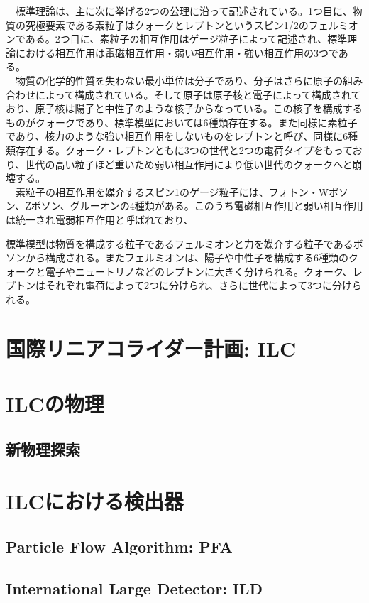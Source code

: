 　標準理論は、主に次に挙げる2つの公理に沿って記述されている。1つ目に、物質の究極要素である素粒子はクォークとレプトンというスピン1/2のフェルミオンである。2つ目に、素粒子の相互作用はゲージ粒子によって記述され、標準理論における相互作用は電磁相互作用・弱い相互作用・強い相互作用の3つである。\\
　物質の化学的性質を失わない最小単位は分子であり、分子はさらに原子の組み合わせによって構成されている。そして原子は原子核と電子によって構成されており、原子核は陽子と中性子のような核子からなっている。この核子を構成するものがクォークであり、標準模型においては6種類存在する。また同様に素粒子であり、核力のような強い相互作用をしないものをレプトンと呼び、同様に6種類存在する。クォーク・レプトンともに3つの世代と2つの電荷タイプをもっており、世代の高い粒子ほど重いため弱い相互作用により低い世代のクォークへと崩壊する。\\
　素粒子の相互作用を媒介するスピン1のゲージ粒子には、フォトン・Wボソン、Zボソン、グルーオンの4種類がある。このうち電磁相互作用と弱い相互作用は統一され電弱相互作用と呼ばれており、

標準模型は物質を構成する粒子であるフェルミオンと力を媒介する粒子であるボソンから構成される。またフェルミオンは、陽子や中性子を構成する6種類のクォークと電子やニュートリノなどのレプトンに大きく分けられる。クォーク、レプトンはそれぞれ電荷によって2つに分けられ、さらに世代によって3つに分けられる。

\section{国際リニアコライダー計画: ILC}

\section{ILCの物理}

\subsection{新物理探索}

\section{ILCにおける検出器}

\subsection{Particle Flow Algorithm: PFA}

\subsection{International Large Detector: ILD}

